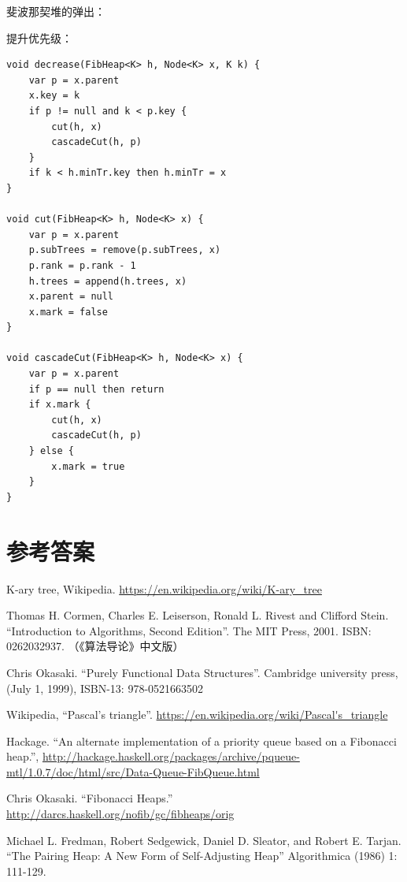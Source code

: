 \documentclass[b5paper]{ctexart}
\begin{document}
斐波那契堆的弹出：


提升优先级：

\begin{lstlisting}[language = Bourbaki]
void decrease(FibHeap<K> h, Node<K> x, K k) {
    var p = x.parent
    x.key = k
    if p != null and k < p.key {
        cut(h, x)
        cascadeCut(h, p)
    }
    if k < h.minTr.key then h.minTr = x
}

void cut(FibHeap<K> h, Node<K> x) {
    var p = x.parent
    p.subTrees = remove(p.subTrees, x)
    p.rank = p.rank - 1
    h.trees = append(h.trees, x)
    x.parent = null
    x.mark = false
}

void cascadeCut(FibHeap<K> h, Node<K> x) {
    var p = x.parent
    if p == null then return
    if x.mark {
        cut(h, x)
        cascadeCut(h, p)
    } else {
        x.mark = true
    }
}
\end{lstlisting}

\ifx\wholebook\relax \else
\section{参考答案}
\shipoutAnswer

\begin{thebibliography}{99}

K-ary tree, Wikipedia. \url{https://en.wikipedia.org/wiki/K-ary_tree}

Thomas H. Cormen, Charles E. Leiserson, Ronald L. Rivest and Clifford Stein. ``Introduction to Algorithms, Second Edition''. The MIT Press, 2001. ISBN: 0262032937. （《算法导论》中文版）

Chris Okasaki. ``Purely Functional Data Structures''. Cambridge university press, (July 1, 1999), ISBN-13: 978-0521663502

Wikipedia, ``Pascal's triangle''. \url{https://en.wikipedia.org/wiki/Pascal's_triangle}

Hackage. ``An alternate implementation of a priority queue based on a Fibonacci heap.'', \url{http://hackage.haskell.org/packages/archive/pqueue-mtl/1.0.7/doc/html/src/Data-Queue-FibQueue.html}

Chris Okasaki. ``Fibonacci Heaps.'' \url{http://darcs.haskell.org/nofib/gc/fibheaps/orig}

Michael L. Fredman, Robert Sedgewick, Daniel D. Sleator, and Robert E. Tarjan. ``The Pairing Heap: A New Form of Self-Adjusting Heap'' Algorithmica (1986) 1: 111-129.

\end{thebibliography}

\expandafter\enddocument
\fi
\end{document}
